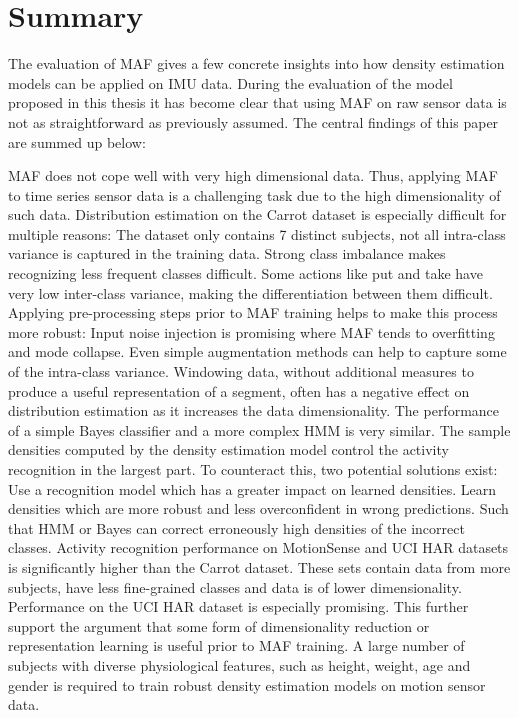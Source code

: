 \documentclass[11pt,titlepage,oneside,openany]{book}
\begin{document}
\section{Summary}
\label{sec:sum}
The evaluation of MAF gives a few concrete insights into how density estimation models can be applied on IMU data. During the  evaluation of the model proposed in this thesis it has become clear that using MAF on raw sensor data is not as straightforward as previously assumed. The central findings of this paper are summed up below:
\begin{outline}
	\1 MAF does not cope well with very high dimensional data.
		\2 Thus, applying MAF to time series sensor data is a challenging task due to the high dimensionality of such data.
	\1 Distribution estimation on the Carrot dataset is especially difficult for multiple reasons:
		\2 The dataset only contains 7 distinct subjects, not all intra-class variance is captured in the training data.
		\2 Strong class imbalance makes recognizing less frequent classes difficult.
		\2 Some actions like put and take have very low inter-class variance, making the differentiation between them difficult.
	\1 Applying pre-processing steps prior to MAF training helps to make this process more robust: 
		\2 Input noise injection is promising where MAF tends to overfitting and mode collapse.
		\2 Even simple augmentation methods can help to capture some of the intra-class variance.
	\1 Windowing data, without additional measures to produce a useful representation of a segment, often has a negative effect on distribution estimation as it increases the data dimensionality.
	\1 The performance of a simple Bayes classifier and a more complex HMM is very similar. The sample densities computed by the density estimation model control the activity recognition in the largest part. To counteract this, two potential solutions exist:
		\2 Use a recognition model which has a greater impact on learned densities.
		\2 Learn densities which are more robust and less overconfident in wrong predictions. Such that HMM or Bayes can correct erroneously high densities of the incorrect classes.
	\1 Activity recognition performance on MotionSense and UCI HAR datasets is significantly higher than the Carrot dataset. These sets contain data from more subjects, have less fine-grained classes and data is of lower dimensionality.
	\1 Performance on the UCI HAR dataset is especially promising. This further support the argument that some form of dimensionality reduction or representation learning is useful prior to MAF training.
	\1 A large number of subjects with diverse physiological features, such as height, weight, age and gender is required to train robust density estimation models on motion sensor data.
\end{outline}
\end{document}
